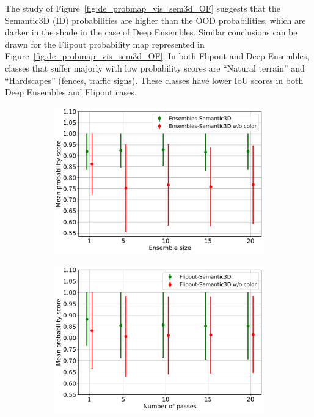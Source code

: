     The study of Figure~\ref{fig:de_probmap_vis_sem3d_OF} suggests that the Semantic3D (ID) probabilities are higher than the OOD probabilities, which are darker in the shade in the case of Deep Ensembles.
    Similar conclusions can be drawn for the Flipout probability map represented in Figure~\ref{fig:de_probmap_vis_sem3d_OF}.
    In both Flipout and Deep Ensembles, classes that suffer majorly with low probability scores are ``Natural terrain'' and ``Hardscapes'' (fences, traffic signs). These classes have lower IoU scores in both Deep Ensembles and Flipout cases.
    \begin{figure}[!ht]
        \centering
        \begin{subfigure}{0.98\textwidth}
            \centering
        \includegraphics[scale=0.5]{images/MSP/Ensembles_MSP_semvsemwoc.pdf}
        \caption{}
        \label{fig:msp_ensembles_ood_2}
        \end{subfigure}
        \begin{subfigure}{0.98\textwidth}
            \centering
        \includegraphics[scale=0.5]{images/MSP/Flipout_MSP_semvsemwoc.pdf}

\end{subfigure}
\end{figure}
